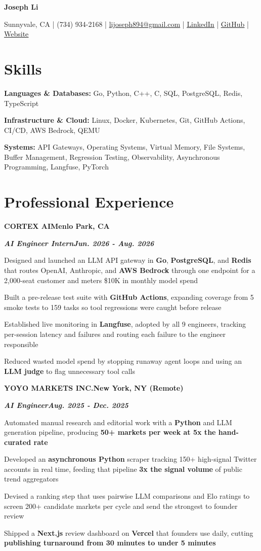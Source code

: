 \documentclass[10pt]{article}
\renewcommand{\resumeheader}[2]{%
  {\centering\fontsize{16}{18}\selectfont\bfseries #1\par}%
  \vspace{4pt}%
  {\centering\fontsize{10.5}{13}\selectfont #2\par}%
  \vspace{6pt}%
}
\renewcommand{\skill}[2]{\textbf{#1:} #2\par\vspace{1.5pt}}
\newcommand{\job}[4]{%
  \vspace{0pt}%
  \textbf{\MakeUppercase{#1}}\hfill\textbf{#2}\par
  \vspace{0.5pt}%
  \textbf{\textit{#3}}\hfill\textbf{\textit{#4}}\par
}
\begin{document}
\resumeheader{Joseph Li}{%
Sunnyvale, CA | (734) 934-2168 | \href{mailto:lijoseph894@gmail.com}{lijoseph894@gmail.com} | \href{https://www.linkedin.com/in/lijoseph894/}{\underline{LinkedIn}} | \href{https://github.com/josephl894}{\underline{GitHub}} | \href{https://josephl894.github.io}{\underline{Website}}}

\section{Skills}
\skill{Languages \& Databases}{Go, Python, C++, C, SQL, PostgreSQL, Redis, TypeScript}
\skill{Infrastructure \& Cloud}{Linux, Docker, Kubernetes, Git, GitHub Actions, CI/CD, AWS Bedrock, QEMU}
\skill{Systems}{API Gateways, Operating Systems, Virtual Memory, File Systems, Buffer Management, Regression Testing, Observability, Asynchronous Programming, Langfuse, PyTorch}

\section{Professional Experience}
\job{Cortex AI}{Menlo Park, CA}{AI Engineer Intern}{Jun. 2026 - Aug. 2026}
\begin{bullets}
  \item Designed and launched an LLM API gateway in \textbf{Go}, \textbf{PostgreSQL}, and \textbf{Redis} that routes OpenAI, Anthropic, and \textbf{AWS Bedrock} through one endpoint for a 2,000-seat customer and meters \$10K in monthly model spend
  \item Built a pre-release test suite with \textbf{GitHub Actions}, expanding coverage from 5 smoke tests to 159 tasks so tool regressions were caught before release
  \item Established live monitoring in \textbf{Langfuse}, adopted by all 9 engineers, tracking per-session latency and failures and routing each failure to the engineer responsible
  \item Reduced wasted model spend by stopping runaway agent loops and using an \textbf{LLM judge} to flag unnecessary tool calls
\end{bullets}

\vspace{3pt}
\job{Yoyo Markets Inc.}{New York, NY (Remote)}{AI Engineer}{Aug. 2025 - Dec. 2025}
\begin{bullets}
  \item Automated manual research and editorial work with a \textbf{Python} and LLM generation pipeline, producing \textbf{50+ markets per week at 5x the hand-curated rate}
  \item Developed an \textbf{asynchronous Python} scraper tracking 150+ high-signal Twitter accounts in real time, feeding that pipeline \textbf{3x the signal volume} of public trend aggregators
  \item Devised a ranking step that uses pairwise LLM comparisons and Elo ratings to screen 200+ candidate markets per cycle and send the strongest to founder review
  \item Shipped a \textbf{Next.js} review dashboard on \textbf{Vercel} that founders use daily, cutting \textbf{publishing turnaround from 30 minutes to under 5 minutes}
\end{bullets}
\end{document}
